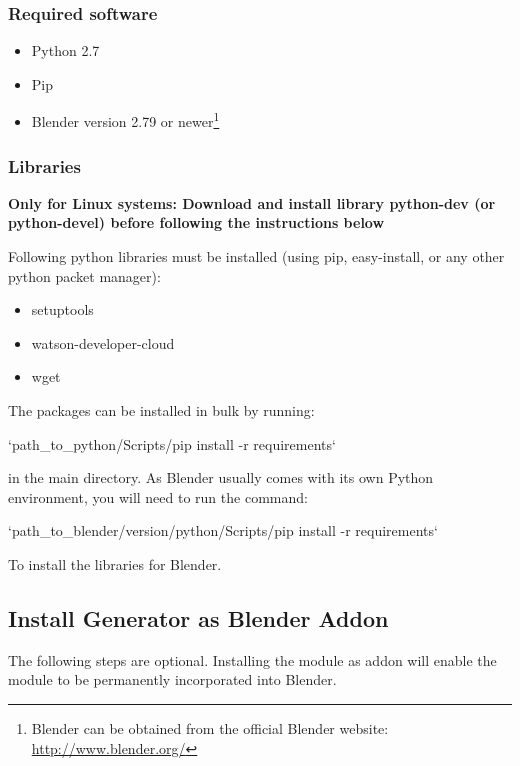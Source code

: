 \subsubsection{Required software}
\smallskip
\begin{itemize}
	\item Python 2.7
	\item Pip
	\item Blender version 2.79 or newer\footnote{Blender can be obtained from the official Blender website:  \url{http://www.blender.org/}}
\end{itemize}

\subsubsection{Libraries}
\smallskip
\textbf{Only for Linux systems: Download and install library python-dev (or python-devel) before following the instructions below}

\noindent Following python libraries must be installed (using pip, easy-install, or any other python packet manager):
\begin{itemize}
	\item setuptools
	\item watson-developer-cloud
	\item wget
\end{itemize}
\noindent The packages can be installed in bulk by running:

\indent `path\_to\_python/Scripts/pip install -r requirements`

\noindent in the main directory. As Blender usually comes with its own Python environment, you will need to run the command:

\indent `path\_to\_blender/version/python/Scripts/pip install -r requirements`

\noindent To install the libraries for Blender.

\subsection{Install Generator as Blender Addon \label{sec:installaddon}}
The following steps are optional. Installing the module as addon will enable the module to be permanently incorporated into Blender.

